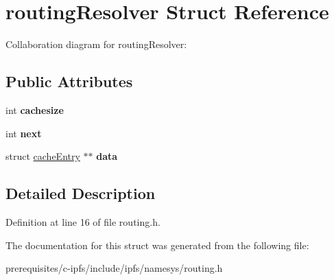 \hypertarget{structrouting_resolver}{}\section{routing\+Resolver Struct Reference}
\label{structrouting_resolver}


Collaboration diagram for routing\+Resolver\+:
\subsection*{Public Attributes}
\begin{DoxyCompactItemize}
\item 
\mbox{\label{structrouting_resolver_a7391efe1b32b24c830c20749f325700f}} 
int {\bfseries cachesize}
\item 
\mbox{\label{structrouting_resolver_a7d2811fc6a92af02e772fac6791623b2}} 
int {\bfseries next}
\item 
\mbox{\label{structrouting_resolver_a695bf80dd9c0868cab31ef5262855966}} 
struct \mbox{\hyperlink{structcache_entry}{cache\+Entry}} $\ast$$\ast$ {\bfseries data}
\end{DoxyCompactItemize}


\subsection{Detailed Description}


Definition at line 16 of file routing.\+h.



The documentation for this struct was generated from the following file\+:\begin{DoxyCompactItemize}
\item 
prerequisites/c-\/ipfs/include/ipfs/namesys/routing.\+h\end{DoxyCompactItemize}

